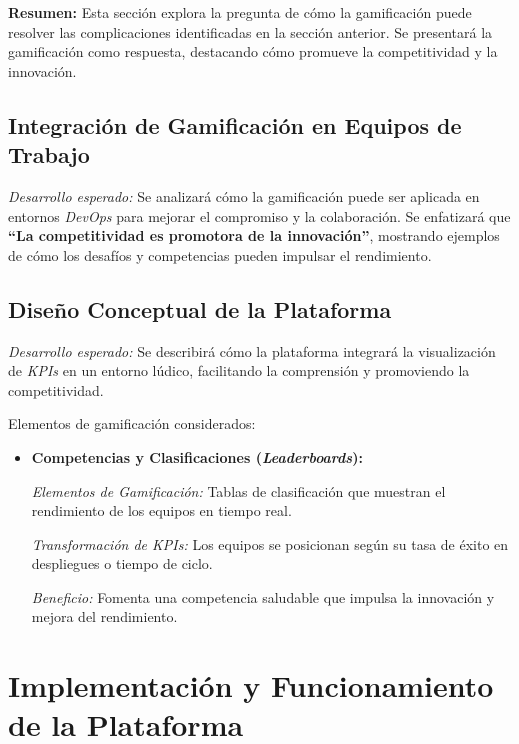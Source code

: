 \documentclass[journal]{IEEEtran}
\begin{document}
\textbf{Resumen:} Esta sección explora la pregunta de cómo la gamificación puede resolver las complicaciones identificadas en la sección anterior. Se presentará la gamificación como respuesta, destacando cómo promueve la competitividad y la innovación.

\subsection{\textbf{Integración de Gamificación en Equipos de Trabajo}}

\textit{Desarrollo esperado:} Se analizará cómo la gamificación puede ser aplicada en entornos \textit{DevOps} para mejorar el compromiso y la colaboración. Se enfatizará que \textbf{``La competitividad es promotora de la innovación''}, mostrando ejemplos de cómo los desafíos y competencias pueden impulsar el rendimiento.

\subsection{\textbf{Diseño Conceptual de la Plataforma}}

\textit{Desarrollo esperado:} Se describirá cómo la plataforma integrará la visualización de \textit{KPIs} en un entorno lúdico, facilitando la comprensión y promoviendo la competitividad.

Elementos de gamificación considerados:

\begin{itemize}
    \item \textbf{Competencias y Clasificaciones (\textit{Leaderboards}):}
    
    \textit{Elementos de Gamificación:} Tablas de clasificación que muestran el rendimiento de los equipos en tiempo real.
    
    \textit{Transformación de \textit{KPIs}:} Los equipos se posicionan según su tasa de éxito en despliegues o tiempo de ciclo.
    
    \textit{Beneficio:} Fomenta una competencia saludable que impulsa la innovación y mejora del rendimiento.
\end{itemize}

\section{\textbf{\Large Implementación y Funcionamiento de la Plataforma}}
\end{document}
